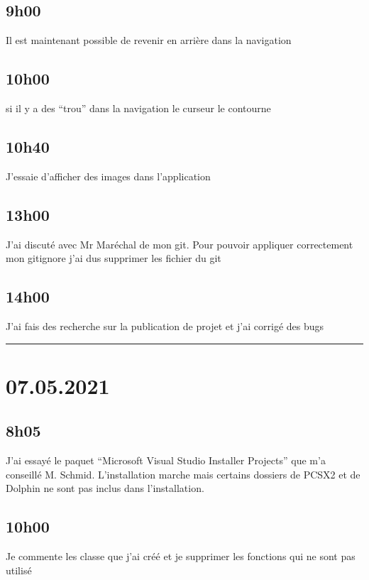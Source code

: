 \documentclass[a4paper,12pt,french]{sphinxmanual}
\begin{document}
\subsection{9h00}
\label{\detokenize{logbook:id78}}
\sphinxAtStartPar
Il est maintenant possible de revenir en arrière dans la navigation


\subsection{10h00}
\label{\detokenize{logbook:id79}}
\sphinxAtStartPar
si il y a des “trou” dans la navigation le curseur le contourne


\subsection{10h40}
\label{\detokenize{logbook:id80}}
\sphinxAtStartPar
J’essaie d’afficher des images dans l’application


\subsection{13h00}
\label{\detokenize{logbook:id81}}
\sphinxAtStartPar
J’ai discuté avec Mr Maréchal de mon git. Pour pouvoir appliquer correctement mon gitignore j’ai dus supprimer les fichier du git


\subsection{14h00}
\label{\detokenize{logbook:id82}}
\sphinxAtStartPar
J’ai fais des recherche sur la publication de projet et j’ai corrigé des bugs


\bigskip\hrule\bigskip



\section{07.05.2021}
\label{\detokenize{logbook:id83}}

\subsection{8h05}
\label{\detokenize{logbook:id84}}
\sphinxAtStartPar
J’ai essayé le paquet “Microsoft Visual Studio Installer Projects” que m’a conseillé M. Schmid. L’installation marche mais certains dossiers de PCSX2 et de Dolphin ne sont pas inclus dans l’installation.


\subsection{10h00}
\label{\detokenize{logbook:id85}}
\sphinxAtStartPar
Je commente les classe que j’ai créé et je supprimer les fonctions qui ne sont pas utilisé
\end{document}
